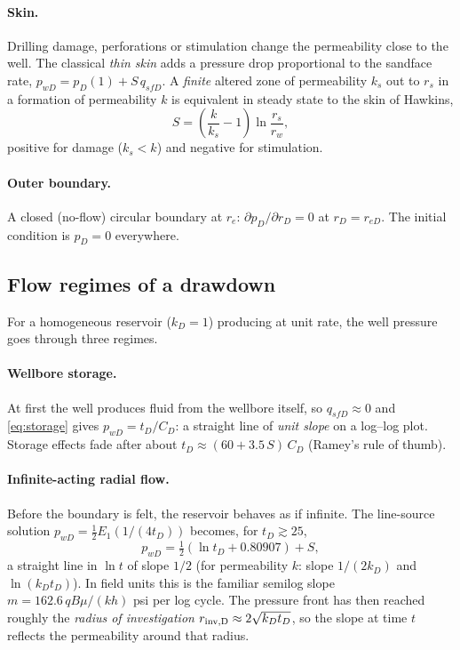 \documentclass[11pt]{article}
\newcommand{\reD}{r_{eD}}
\begin{document}
\paragraph{Skin.} Drilling damage, perforations or stimulation change the permeability close to the well. The
classical \emph{thin skin} adds a pressure drop proportional to the sandface rate,
$p_{wD} = p_D(1) + S\, q_{sfD}$. A \emph{finite} altered zone of permeability $k_s$ out to $r_s$ in a formation of
permeability $k$ is equivalent in steady state to the skin of Hawkins,
\begin{equation}
  S = \left(\frac{k}{k_s} - 1\right)\ln\frac{r_s}{r_w},
  \label{eq:hawkins}
\end{equation}
positive for damage ($k_s<k$) and negative for stimulation.
\paragraph{Outer boundary.} A closed (no-flow) circular boundary at $r_e$: $\partial p_D/\partial r_D = 0$ at
$r_D = \reD$. The initial condition is $p_D = 0$ everywhere.

\subsection{Flow regimes of a drawdown}

For a homogeneous reservoir ($k_D = 1$) producing at unit rate, the well pressure goes through three regimes.

\paragraph{Wellbore storage.} At first the well produces fluid from the wellbore itself, so $q_{sfD}\approx 0$ and
\eqref{eq:storage} gives $p_{wD} = t_D / C_D$: a straight line of \emph{unit slope} on a log--log plot. Storage
effects fade after about $t_D \approx (60 + 3.5\,S)\,C_D$ (Ramey's rule of thumb).

\paragraph{Infinite-acting radial flow.} Before the boundary is felt, the reservoir behaves as if infinite. The
line-source solution $p_{wD} = \tfrac12 E_1\!\left(1/(4t_D)\right)$ becomes, for $t_D \gtrsim 25$,
\begin{equation}
  p_{wD} = \tfrac12\left(\ln t_D + 0.80907\right) + S ,
  \label{eq:semilog}
\end{equation}
a straight line in $\ln t$ of slope $1/2$ (for permeability $k$: slope $1/(2k_D)$ and $\ln(k_D t_D)$). In field
units this is the familiar semilog slope $m = 162.6\,qB\mu/(kh)$ psi per log cycle. The pressure front has then
reached roughly the \emph{radius of investigation} $r_{\rm inv,D} \approx 2\sqrt{k_D t_D}$, so the slope at time
$t$ reflects the permeability around that radius.
\end{document}
